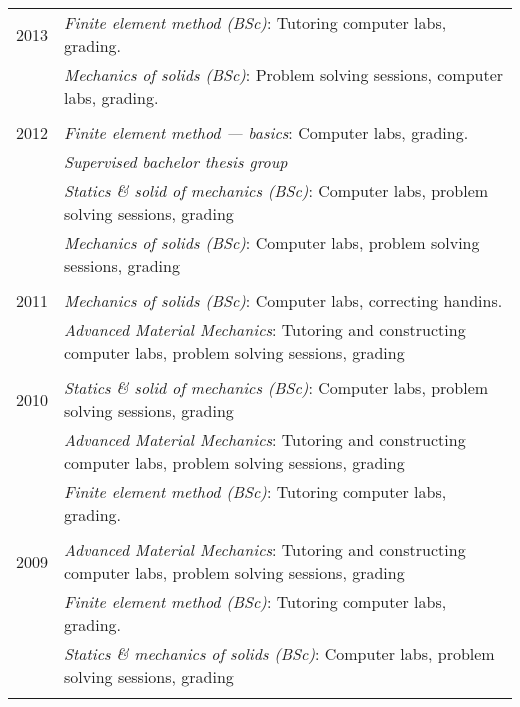\documentclass[a4paper,10pt]{article} %
\begin{document}
\begin{tabular}{r|p{11cm}}
\textsc{2013} 
              & \emph{Finite element method (BSc)}: \footnotesize{Tutoring computer labs, grading.}\\
              & \emph{Mechanics of solids (BSc)}: \footnotesize{Problem solving sessions, computer labs, grading.}\\
\multicolumn{2}{c}{} \\


\textsc{2012} 
              & \emph{Finite element method --- basics}: \footnotesize{Computer labs, grading.}\\
              & \emph{Supervised bachelor thesis group}\\
              & \emph{Statics \& solid of mechanics (BSc)}: \footnotesize{Computer labs, problem solving sessions, grading}\\
              & \emph{Mechanics of solids (BSc)}: \footnotesize{Computer labs, problem solving sessions, grading}\\
\multicolumn{2}{c}{} \\


\textsc{2011} 
              & \emph{Mechanics of solids (BSc)}: \footnotesize{Computer labs, correcting handins.}\\
              & \emph{Advanced Material Mechanics}: \footnotesize{Tutoring and constructing computer labs, problem solving sessions, grading}\\
\multicolumn{2}{c}{} \\


\textsc{2010} 
              & \emph{Statics \& solid of mechanics (BSc)}: \footnotesize{Computer labs, problem solving sessions, grading}\\
              & \emph{Advanced Material Mechanics}: \footnotesize{Tutoring and constructing computer labs, problem solving sessions, grading}\\
              & \emph{Finite element method (BSc)}: \footnotesize{Tutoring computer labs, grading.}\\
\multicolumn{2}{c}{} \\


\textsc{2009} 
              & \emph{Advanced Material Mechanics}: \footnotesize{Tutoring and constructing computer labs, problem solving sessions, grading}\\
              & \emph{Finite element method (BSc)}: \footnotesize{Tutoring computer labs, grading.}\\
              & \emph{Statics \& mechanics of solids (BSc)}: \footnotesize{Computer labs, problem solving sessions, grading}\\
\multicolumn{2}{c}{} \\


\end{tabular}
\end{document}

